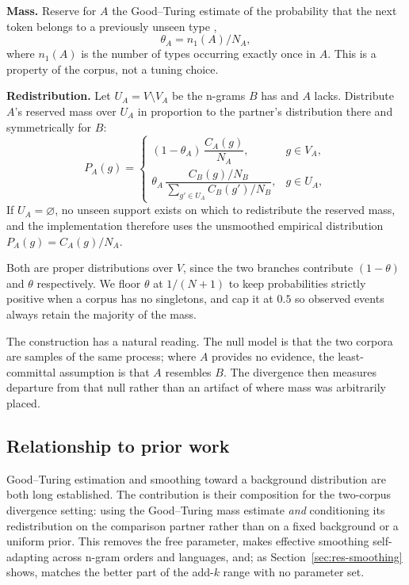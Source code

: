 \documentclass[conference]{IEEEtran}
\begin{document}
\textbf{Mass.} Reserve for $A$ the Good--Turing estimate of the probability that
the next token belongs to a previously unseen type \cite{good1953,gale1995},
\begin{equation}
\theta_A = n_1(A)/N_A ,
\end{equation}
where $n_1(A)$ is the number of types occurring exactly once in $A$. This is a
property of the corpus, not a tuning choice.

\textbf{Redistribution.} Let $U_A = V \setminus V_A$ be the n-grams $B$ has and
$A$ lacks. Distribute $A$'s reserved mass over $U_A$ in proportion to the
partner's distribution there and symmetrically for $B$:
\begin{equation}
P_A(g) =
\begin{cases}
(1-\theta_A)\,\dfrac{C_A(g)}{N_A}, & g \in V_A,\\[2ex]
\theta_A\,\dfrac{C_B(g)/N_B}{\sum_{g' \in U_A} C_B(g')/N_B}, & g \in U_A,
\end{cases}
\end{equation}
If $U_A = \varnothing$, no unseen support exists on which to redistribute the reserved mass, and the implementation therefore uses the unsmoothed empirical distribution $P_A(g) = C_A(g)/N_A$.

\vspace{1em}Both are proper distributions over $V$, since the two
branches contribute $(1-\theta)$ and $\theta$ respectively. We floor $\theta$ at
$1/(N+1)$ to keep probabilities strictly positive when a corpus has no
singletons, and cap it at $0.5$ so observed events always retain the majority of
the mass.

The construction has a natural reading. The null model is that the two corpora
are samples of the same process; where $A$ provides no evidence, the
least-committal assumption is that $A$ resembles $B$. The divergence then measures
departure from that null rather than an artifact of where mass was arbitrarily
placed.


\subsection{Relationship to prior work}
\label{sec:rgt-novelty}
Good--Turing estimation \cite{good1953,gale1995} and smoothing toward a
background distribution \cite{zhai2004} are both long established. The
contribution is their composition for the two-corpus divergence setting: using
the Good--Turing mass estimate \emph{and} conditioning its redistribution on the
comparison partner rather than on a fixed background or a uniform prior. This
removes the free parameter, makes effective smoothing self-adapting across n-gram
orders and languages, and; as Section~\ref{sec:res-smoothing} shows, matches
the better part of the add-$k$ range with no parameter set.
\end{document}
